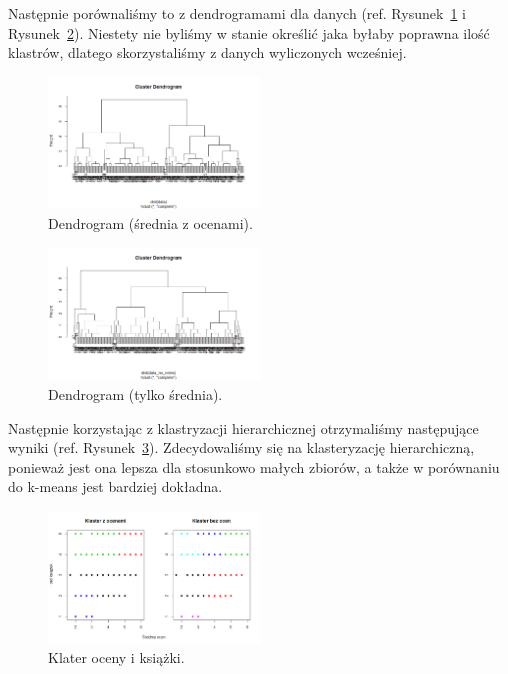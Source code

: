 \documentclass[conference]{IEEEtran}
\begin{document}
Następnie porównaliśmy to z dendrogramami dla danych (ref. Rysunek~\ref{fig:dendrogramam_jeden} i Rysunek~\ref{fig:dendrogramam_dwa}). Niestety nie byliśmy w stanie określić jaka byłaby poprawna ilość klastrów, dlatego skorzystaliśmy z danych wyliczonych wcześniej.

\begin{figure}
	\centering
	\includegraphics[width=0.5\textwidth]{13.png}
	\caption{Dendrogram (średnia z ocenami).}
	\label{fig:dendrogramam_jeden}
\end{figure}
\begin{figure}
	\centering
	\includegraphics[width=0.5\textwidth]{14.png}
	\caption{Dendrogram (tylko średnia).}
	\label{fig:dendrogramam_dwa}
\end{figure}

Następnie korzystając z klastryzacji hierarchicznej otrzymaliśmy następujące wyniki (ref. Rysunek~\ref{fig:klaster}). Zdecydowaliśmy się na klasteryzację hierarchiczną, ponieważ jest ona lepsza dla stosunkowo małych zbiorów, a także w porównaniu do k-means jest bardziej dokładna.

\begin{figure}
	\centering
	\includegraphics[width=0.5\textwidth]{15.png}
	\caption{Klater oceny i książki.}
	\label{fig:klaster}
\end{figure}
\end{document}
